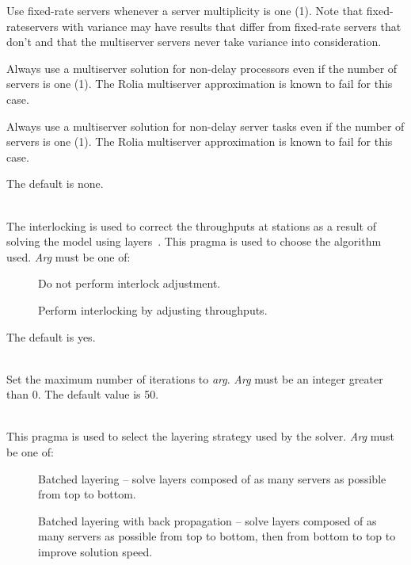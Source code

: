 \begin{description}
\begin{description}
Use fixed-rate servers whenever a server multiplicity is one (1).
Note that fixed-rateservers with variance
may have results that differ from fixed-rate servers that don't and that the
multiserver servers never take variance into consideration.
\item[\optarg{processors}{}]
Always use a multiserver solution for non-delay processors even if the number of servers is one (1).
The Rolia multiserver approximation is known to fail for this case.
\item[\optarg{tasks}{}]
Always use a multiserver solution for non-delay server tasks even if the number of servers is one (1).
The Rolia multiserver approximation is known to fail for this case.
\end{description}
The default is none.
\item[\optarg{interlocking}{=\emph{arg}}]~\\
The interlocking is used to correct the throughputs at stations as a
result of solving the model using layers~\cite{perf:franks-95-ipds-interlock}.  This pragma is used to
choose the algorithm used.
\emph{Arg} must be one of: 
\begin{description}
\item[]
Do not perform interlock adjustment.
\item[]
Perform interlocking by adjusting throughputs.
\end{description}
The default is yes.
\item[\optarg{iteration-limit}{=\emph{arg}}]~\\
Set the maximum number of iterations to \emph{arg}.
\emph{Arg} must be an integer greater than 0.  The default value is 50.
\item[\optarg{layering}{=\emph{arg}}]~\\
This pragma is used to select the layering strategy used by the solver.
\emph{Arg} must be one of: 
\begin{description}
\item[]
Batched layering -- solve layers composed of as many servers as possible from top to bottom.
\item[]
Batched layering with back propagation -- solve layers composed of as many servers as possible from top to bottom, then from bottom to top to improve solution speed.

\end{description}
\end{description}
